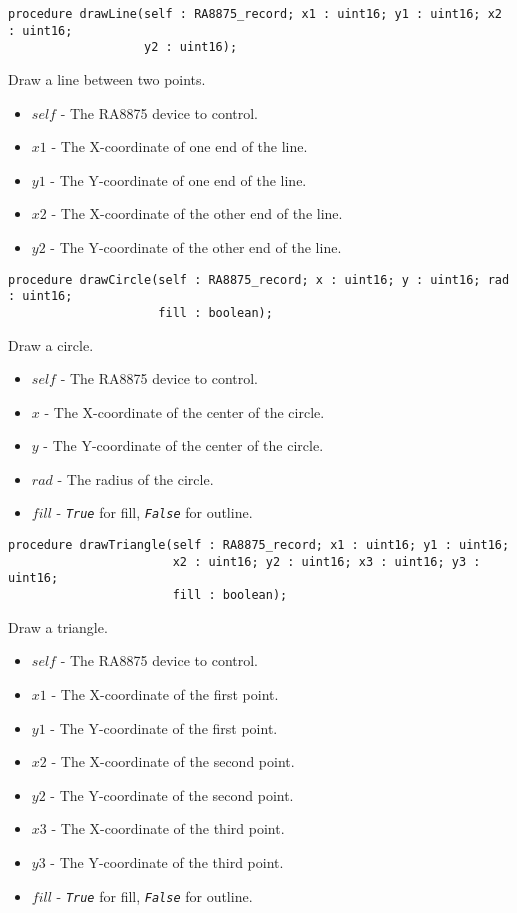 \documentclass[10pt, openany]{book}
\newcommand{\constant}[1]{\emph{\texttt{#1}}}
\begin{document}
\begin{lstlisting}
procedure drawLine(self : RA8875_record; x1 : uint16; y1 : uint16; x2 : uint16;
                   y2 : uint16);
\end{lstlisting}
Draw a line between two points.
\begin{itemize}
  \item $self$ - The RA8875 device to control.
  \item $x1$ - The X-coordinate of one end of the line.
  \item $y1$ - The Y-coordinate of one end of the line.
  \item $x2$ - The X-coordinate of the other end of the line.
  \item $y2$ - The Y-coordinate of the other end of the line.
\end{itemize}

\begin{lstlisting}
procedure drawCircle(self : RA8875_record; x : uint16; y : uint16; rad : uint16;
                     fill : boolean);
\end{lstlisting}
Draw a circle.
\begin{itemize}
  \item $self$ - The RA8875 device to control.
  \item $x$ - The X-coordinate of the center of the circle.
  \item $y$ - The Y-coordinate of the center of the circle.
  \item $rad$ - The radius of the circle.
  \item $fill$ - \constant{True} for fill, \constant{False} for outline.
\end{itemize}

\begin{lstlisting}
procedure drawTriangle(self : RA8875_record; x1 : uint16; y1 : uint16;
                       x2 : uint16; y2 : uint16; x3 : uint16; y3 : uint16;
                       fill : boolean);
\end{lstlisting}
Draw a triangle.
\begin{itemize}
  \item $self$ - The RA8875 device to control.
  \item $x1$ - The X-coordinate of the first point.
  \item $y1$ - The Y-coordinate of the first point.
  \item $x2$ - The X-coordinate of the second point.
  \item $y2$ - The Y-coordinate of the second point.
  \item $x3$ - The X-coordinate of the third point.
  \item $y3$ - The Y-coordinate of the third point.
  \item $fill$ - \constant{True} for fill, \constant{False} for outline.
\end{itemize}
\end{document}
